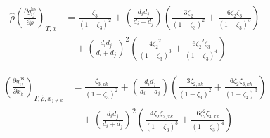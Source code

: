 \documentclass[12pt, letterpaper]{article}
\begin{document}
\begin{equation}
    \begin{aligned}
        \hat{\rho}\left(\frac{\partial g_{ij}^{\mathrm{hs}}}{\partial\hat{\rho}}\right)_{T,x}
        &=
        \frac{\zeta_{3}}{\left(1-\zeta_{3}\right)^{2}}
        +
        \left(\frac{d_{i}d_{j}}{d_{i}+d_{j}}\right)
        \left(
            \frac{3\zeta_{2}}{\left(1-\zeta_{3}\right)^{2}}
            +
            \frac{6\zeta_{2}\zeta_{3}}{\left(1-\zeta_{3}\right)^{3}}
        \right)
        \\
        &\quad +
        \left(\frac{d_{i}d_{j}}{d_{i}+d_{j}}\right)^{2}
        \left(
            \frac{4{\zeta_{2}}^{2}}{\left(1-{\zeta_{3}}\right)^{3}}
            +
            \frac{6{\zeta_{2}}^{2}\zeta_{3}}{\left(1-{\zeta_{3}}\right)^{4}}
        \right)
    \end{aligned}
    \label{eq:ghs_contact_dadrho}
\end{equation}


\begin{equation}
    \begin{aligned}
        \left(\frac{\partial g_{ij}^{\mathrm{hs}}}{\partial x_{k}}\right)_{T,\hat{\rho},x_{j\neq k}}
        &=\frac{\zeta_{3,xk}}{\left(1-\zeta_{3}\right)^{2}}
        +\left(\frac{d_{i}d_{j}}{d_{i}+d_{j}}\right)
        \left(\frac{3\zeta_{2,xk}}{(1-\zeta_{3})^{2}}+\frac{6\zeta_{2}\zeta_{3,xk}}{(1-\zeta_{3})^{3}}\right)
        \\
        &\quad +\left(\frac{d_{i}d_{j}}{d_{i}+d_{j}}\right)^{2}
        \left(\frac{4\zeta_{2}\zeta_{2,xk}}{(1-\zeta_{3})^{3}}+\frac{6\zeta_{2}^{2}\zeta_{3,xk}}{(1-\zeta_{3})^{4}}\right)
    \end{aligned}
    \label{eq:ghs_contact_dxk}
\end{equation}

\end{document}
